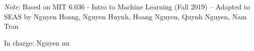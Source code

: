 \documentclass[11pt]{article}
\begin{document}



\emph{Note}: Based on MIT 6.036 - Intro to Machine Learning (Fall 2019) -- Adapted to SEAS by Nguyen Hoang, Nguyen Huynh, Hoang Nguyen, Quynh Nguyen, Nam Tran

In charge: Nguyen nu




\end{document}

